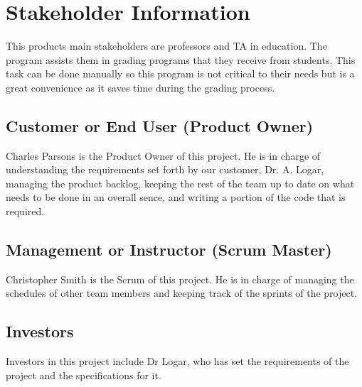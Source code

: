 

\section{ Stakeholder Information}
This products main stakeholders are professors and TA in education.
The program assists them in grading programs that they receive from students. 
This task can be done manually so this program is not critical to their needs but is a 
great convenience as it saves time during the grading process.



\subsection{Customer or End User (Product Owner)}
Charles Parsons is the Product Owner of this project. He is in charge of understanding the requirements set forth by our
customer, Dr. A. Logar, managing the product backlog, keeping the rest of the team up to date on what
needs to be done in an overall sence, and writing a portion of the code that is required.


\subsection{Management or Instructor (Scrum Master)}
Christopher Smith is the Scrum of this project. He is in charge of managing the schedules of other team members
and keeping track of the sprints of the project.



\subsection{Investors}
Investors in this project include Dr Logar, who has set the requirements of the project and the specifications for it.



